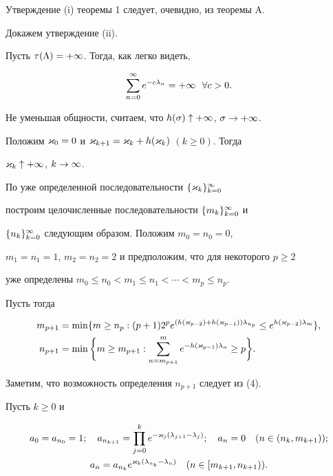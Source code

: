 Утверждение (i) теоремы 1 следует, очевидно, из теоремы A.


Докажем утверждение (ii). 





Пусть $\tau(\Lambda)=+\infty$. Тогда, как легко видеть,


\begin{equation}


\sum_{n=0}^\i e^{-c\l_n}=+\i\ \ \forall c>0.


\end{equation}





Не уменьшая общности, считаем, что $h(\sigma)\uparrow+\infty$, $\sigma\to+\infty$.


Положим $\varkappa_0=0$ и $\varkappa_{k+1}=\varkappa_k+h(\varkappa_k)$ $(k\ge 0)$. Тогда


$\varkappa_k\uparrow+\infty$, $k\to\infty$.





По уже определенной последовательности $\{\varkappa_k\}_{k=0}^\infty$


построим целочисленные последовательности $\{m_k\}_{k=0}^\infty$ и


$\{n_k\}_{k=0}^\infty$ следующим образом. Положим $m_0=n_0=0$,


$m_1=n_1=1$, $m_2=n_2=2$ и предположим, что для некоторого $p\ge 2$


уже определены $m_0\le n_0<m_1\le n_1<\dotsb<m_p\le n_p$.


Пусть тогда


\begin{align*}


m_{p+1}&=\min\{m\ge n_p:(p+1)2^p


e^{(h(\k_{p-2})+h(\k_{p-1}))\l_{n_p}}\le


e^{h(\k_{p-2})\l_m}\},\\


%


n_{p+1}&=\min\bigg\{m\ge m_{p+1}:


\sum_{n=m_{p+1}}^me^{-h(\k_{p-1})\l_n}\ge p\bigg\}.


\end{align*}


Заметим, что возможность определения $n_{p+1}$ следует из (4).





Пусть $k\ge 0$ и


\begin{gather}


a_0=a_{n_0}=1;\q


a_{n_{k+1}}=\prod_{j=0}^ke^{-\k_j(\l_{j+1}-\l_j)};


\q a_n=0\q (n\in(n_k,m_{k+1}));\\ 


%


a_n=a_{n_k}e^{\k_k(\l_{n_k}-\l_n)}\q (n\in [m_{k+1},n_{k+1})).


\end{gather}


